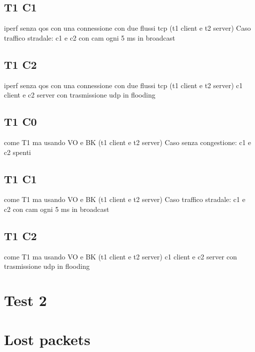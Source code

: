 \subsection[T1 C1]{T1 C1}
iperf senza qos con una connessione con due flussi tcp (t1 client e t2 server)
Caso traffico stradale: c1 e c2 con cam ogni 5 ms in broadcast

\subsection[T1 C1]{T1 C2}
iperf senza qos con una connessione con due flussi tcp (t1 client e t2 server)
c1 client e c2 server con trasmissione udp in flooding

\subsection[T2 C1]{T1 C0}
come T1 ma usando VO e BK (t1 client e t2 server)
Caso senza congestione: c1 e c2 spenti

\subsection[T2 C1]{T1 C1}
come T1 ma usando VO e BK (t1 client e t2 server)
Caso traffico stradale: c1 e c2 con cam ogni 5 ms in broadcast

\subsection[T2 C1]{T1 C2}
come T1 ma usando VO e BK (t1 client e t2 server)
c1 client e c2 server con trasmissione udp in flooding
\section{Test 2}

\section{Lost packets}